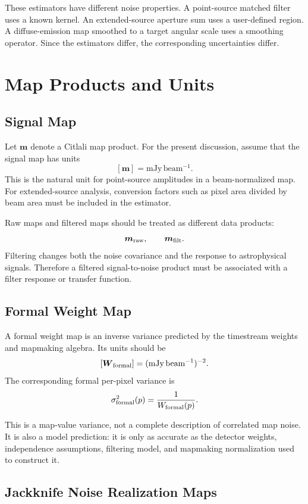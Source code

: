 \documentclass[11pt]{article}
\newcommand{\map}{\boldsymbol{m}}
\newcommand{\weight}{\boldsymbol{W}}
\begin{document}
These estimators have different noise properties. A point-source matched filter
uses a known kernel. An extended-source aperture sum uses a user-defined region.
A diffuse-emission map smoothed to a target angular scale uses a smoothing
operator. Since the estimators differ, the corresponding uncertainties differ.

\section{Map Products and Units}

\subsection{Signal Map}

Let \(\map\) denote a Citlali map product. For the present discussion, assume
that the signal map has units
\[
  [\map] = \mathrm{mJy\,beam^{-1}}.
\]
This is the natural unit for point-source amplitudes in a beam-normalized map.
For extended-source analysis, conversion factors such as pixel area divided by
beam area must be included in the estimator.

Raw maps and filtered maps should be treated as different data products:
\[
  \map_{\rm raw}, \qquad \map_{\rm filt}.
\]
Filtering changes both the noise covariance and the response to astrophysical
signals. Therefore a filtered signal-to-noise product must be associated with a
filter response or transfer function.

\subsection{Formal Weight Map}

A formal weight map is an inverse variance predicted by the timestream weights
and mapmaking algebra. Its units should be
\[
  [\weight_{\rm formal}] = (\mathrm{mJy\,beam^{-1}})^{-2}.
\]
The corresponding formal per-pixel variance is
\[
  \sigma^2_{\rm formal}(p) = \frac{1}{W_{\rm formal}(p)}.
\]

This is a map-value variance, not a complete description of correlated map
noise. It is also a model prediction: it is only as accurate as the detector
weights, independence assumptions, filtering model, and mapmaking normalization
used to construct it.

\subsection{Jackknife Noise Realization Maps}
\end{document}
